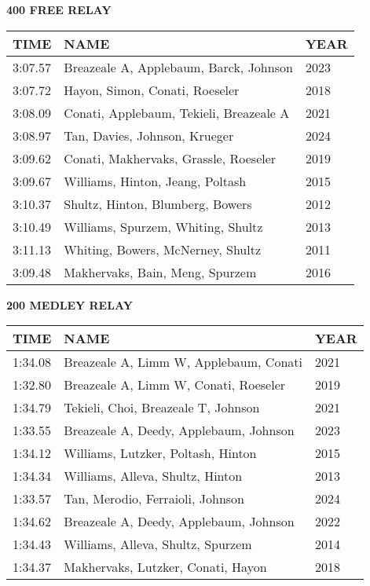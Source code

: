 \begin{center}
\begin{minipage}[t]{0.7\textwidth}
\centering
\textbf{400 FREE RELAY}\\[0.05cm]
\begin{tabular}{@{}p{1.8cm}p{2.8cm}p{1.2cm}@{}}
\hline
\textbf{TIME} & \textbf{NAME} & \textbf{YEAR} \\
\hline
3:07.57 & Breazeale A, Applebaum, Barck, Johnson & 2023 \\
3:07.72 & Hayon, Simon, Conati, Roeseler & 2018 \\
3:08.09 & Conati, Applebaum, Tekieli, Breazeale A & 2021 \\
3:08.97 & Tan, Davies, Johnson, Krueger & 2024 \\
3:09.62 & Conati, Makhervaks, Grassle, Roeseler & 2019 \\
3:09.67 & Williams, Hinton, Jeang, Poltash & 2015 \\
3:10.37 & Shultz, Hinton, Blumberg, Bowers & 2012 \\
3:10.49 & Williams, Spurzem, Whiting, Shultz & 2013 \\
3:11.13 & Whiting, Bowers, McNerney, Shultz & 2011 \\
3:09.48 & Makhervaks, Bain, Meng, Spurzem & 2016 \\
\hline
\end{tabular}
\end{minipage}
\end{center}

\vspace{0.4cm}

\begin{center}
\begin{minipage}[t]{0.7\textwidth}
\centering
\textbf{200 MEDLEY RELAY}\\[0.05cm]
\begin{tabular}{@{}p{1.8cm}p{2.8cm}p{1.2cm}@{}}
\hline
\textbf{TIME} & \textbf{NAME} & \textbf{YEAR} \\
\hline
1:34.08 & Breazeale A, Limm W, Applebaum, Conati & 2021 \\
1:32.80 & Breazeale A, Limm W, Conati, Roeseler & 2019 \\
1:34.79 & Tekieli, Choi, Breazeale T, Johnson & 2021 \\
1:33.55 & Breazeale A, Deedy, Applebaum, Johnson & 2023 \\
1:34.12 & Williams, Lutzker, Poltash, Hinton & 2015 \\
1:34.34 & Williams, Alleva, Shultz, Hinton & 2013 \\
1:33.57 & Tan, Merodio, Ferraioli, Johnson & 2024 \\
1:34.62 & Breazeale A, Deedy, Applebaum, Johnson & 2022 \\
1:34.43 & Williams, Alleva, Shultz, Spurzem & 2014 \\
1:34.37 & Makhervaks, Lutzker, Conati, Hayon & 2018 \\
\hline
\end{tabular}
\end{minipage}
\end{center}

